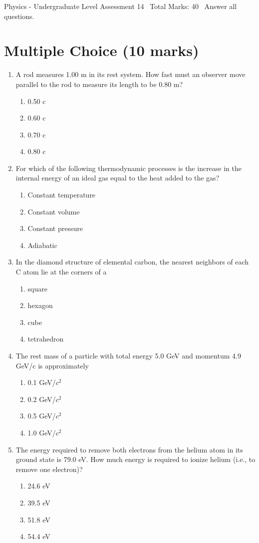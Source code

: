 \documentclass[12pt]{article}
\begin{document}
\begin{center}
Physics - Undergraduate Level Assessment 14 \
Total Marks: 40 \
Answer all questions.
\end{center}

\section*{Multiple Choice (10 marks)}
\begin{enumerate}[label=\arabic*.]
\item A rod measures 1.00 m in its rest system. How fast must an observer move parallel to the rod to measure its length to be 0.80 m?
\begin{enumerate}[label=(\alph*)]
    \item 0.50 c
    \item 0.60 c
    \item 0.70 c
    \item 0.80 c
\end{enumerate}
\item For which of the following thermodynamic processes is the increase in the internal energy of an ideal gas equal to the heat added to the gas?
\begin{enumerate}[label=(\alph*)]
    \item Constant temperature
    \item Constant volume
    \item Constant pressure
    \item Adiabatic
\end{enumerate}
\item In the diamond structure of elemental carbon, the nearest neighbors of each C atom lie at the corners of a
\begin{enumerate}[label=(\alph*)]
    \item square
    \item hexagon
    \item cube
    \item tetrahedron
\end{enumerate}
\item The rest mass of a particle with total energy 5.0 GeV and momentum 4.9 GeV/c is approximately
\begin{enumerate}[label=(\alph*)]
    \item 0.1 GeV/$c^2$
    \item 0.2 GeV/$c^2$
    \item 0.5 GeV/$c^2$
    \item 1.0 GeV/$c^2$
\end{enumerate}
\item The energy required to remove both electrons from the helium atom in its ground state is 79.0 eV. How much energy is required to ionize helium (i.e., to remove one electron)?
\begin{enumerate}[label=(\alph*)]
    \item 24.6 eV
    \item 39.5 eV
    \item 51.8 eV
    \item 54.4 eV
\end{enumerate}
\end{enumerate}
\end{document}
